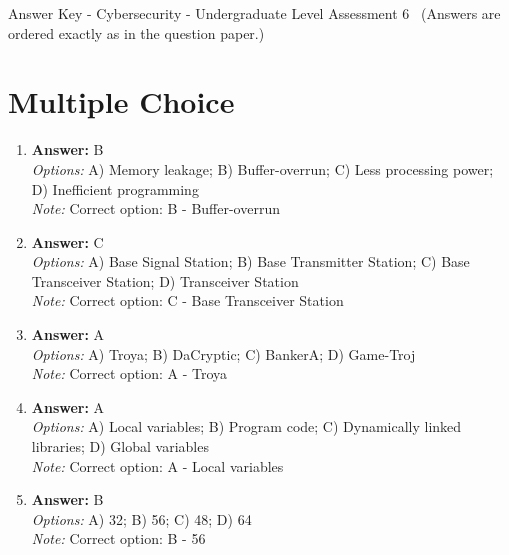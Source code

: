 \documentclass[12pt]{article}
\begin{document}
\begin{center}
Answer Key - Cybersecurity - Undergraduate Level Assessment 6 \
\small (Answers are ordered exactly as in the question paper.)
\end{center}

\section*{Multiple Choice}
\begin{enumerate}[label=\arabic*.]
\item \textbf{Answer:} B
\\ \textit{Options:} A) Memory leakage; B) Buffer-overrun; C) Less processing power; D) Inefficient programming
\\ \textit{Note:} Correct option: B - Buffer-overrun
\item \textbf{Answer:} C
\\ \textit{Options:} A) Base Signal Station; B) Base Transmitter Station; C) Base Transceiver Station; D) Transceiver Station
\\ \textit{Note:} Correct option: C - Base Transceiver Station
\item \textbf{Answer:} A
\\ \textit{Options:} A) Troya; B) DaCryptic; C) BankerA; D) Game-Troj
\\ \textit{Note:} Correct option: A - Troya
\item \textbf{Answer:} A
\\ \textit{Options:} A) Local variables; B) Program code; C) Dynamically linked libraries; D) Global variables
\\ \textit{Note:} Correct option: A - Local variables
\item \textbf{Answer:} B
\\ \textit{Options:} A) 32; B) 56; C) 48; D) 64
\\ \textit{Note:} Correct option: B - 56
\end{enumerate}
\end{document}
